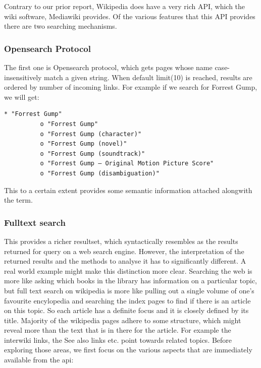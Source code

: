 \documentclass[11pt]{article}
\begin{document}
\label{March9to29}
Contrary to our prior report, Wikipedia does have a very rich API, which the wiki software, Mediawiki provides. Of the various features that this API provides there are two searching mechanisms. 

\subsubsection{Opensearch Protocol}
The first one is Opensearch protocol, which gets pages whose name case-insensitively match a given string. When default limit(10) is reached, results are ordered by number of incoming links. For example if we search for Forrest Gump, we will get:

\begin{lstlisting}[label=Opensearch Protocol, caption=Result using Opensearch]
    * "Forrest Gump"
          o "Forrest Gump"
          o "Forrest Gump (character)"
          o "Forrest Gump (novel)"
          o "Forrest Gump (soundtrack)"
          o "Forrest Gump – Original Motion Picture Score"
          o "Forrest Gump (disambiguation)"

\end{lstlisting}

This to a certain extent provides some semantic information attached alongwith the term.

\subsubsection{Fulltext search}
This provides a richer resultset, which syntactically resembles as the results returned for query on a web search engine. However, the interpretation of the returned results and the methods to analyse it has to significantly different. A real world example might make this distinction more clear. Searching the web is more like asking which books in the library has information on a particular topic, but full text search on wikipedia is more like pulling out a single volume of one's favourite encylopedia and searching the index pages to find if there is an article on this topic. So each article has a definite focus and it is closely defined by its title. Majority of the wikipedia pages adhere to some structure, which might reveal more than the text that is in there for the article. For example the interwiki links, the See also links etc. point towards related topics. Before exploring those areas, we first focus on the various aspects that are immediately available from the api:
\end{document}
